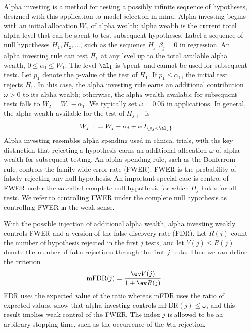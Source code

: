 \documentclass[12pt]{article}
\begin{document}
 Alpha investing \citep{fosterstine08} is a method for testing a possibly
 infinite sequence of hypotheses, designed with this application to model
 selection in mind.  Alpha investing begins with an initial allocation $W_1$ of
 alpha wealth; alpha wealth is the current total alpha level that can be spent
 to test subsequent hypotheses.  Label a sequence of null hypotheses $H_1, H_2,
 \ldots$, such as the sequence $H_j: \beta_j=0$ in regression.  An alpha
 investing rule can test $H_1$ at any level up to the total available alpha
 wealth, $0 \le \alpha_1 \le W_1$.  The level $\al_1$ is 'spent' and cannot be
 used for subsequent tests.  Let $p_1$ denote the p-value of the test of $H_1$.
  If $p_1 \le \alpha_1$, the initial test rejects $H_1$.  In this case, the
 alpha investing rule earns an additional contribution $\omega >
 0$ \marginpar{$\omega$} to its alpha wealth; otherwise, the alpha wealth
 available for subsequent tests falls to $W_2 = W_1 - \alpha_1$.  We typically
 set $\omega = 0.05$ in applications.  In general, the alpha wealth available for
 the test of $H_{j+1}$ is 
 \begin{equation}
    W_{j+1} = W_j - \alpha_j + \omega \, I_{\{p_j < \al_j\}}
 \label{eq:Wj}
 \end{equation}
 Alpha investing resembles alpha spending used in clinical trials, with the key
 distinction that rejecting a hypothesis earns an additional allocation $\omega$
 of alpha wealth for subsequent testing.  An alpha spending rule, such as the
 Bonferroni rule, controls the family wide error rate (FWER).  FWER is the
 probability of falsely rejecting any null hypothesis.  An important special
 case is control of FWER under the so-called complete null hypothesis for which
 $H_j$ holds for all tests.  We refer to controlling FWER under the complete
 null hypothesis as controlling FWER in the weak sense.  


 With the possible injection of additional alpha wealth, alpha investing weakly
 controls FWER and a version of the false discovery rate (FDR).  Let $R(j)$
 count the number of hypothesis rejected in the first $j$ tests, and let $V(j)
 \le R(j)$ denote the number of false rejections through the first $j$ tests.
  Then we can define the criterion
 \begin{equation}
    \mbox{mFDR}(j) = \frac{\ev V(j)}{1+\ev R(j)} \;.
 \label{eq:mFDR}
 \end{equation}
 FDR uses the expected value of the ratio whereas mFDR uses the ratio of
 expected values.  \citet{fosterstine08} show that alpha investing controls
 $\mbox{mFDR}(j) \le \omega$, and this result implies weak control of the FWER.
  The index $j$ is allowed to be an arbitrary stopping time, such as the
 occurrence of the $k$th rejection.
\end{document}
